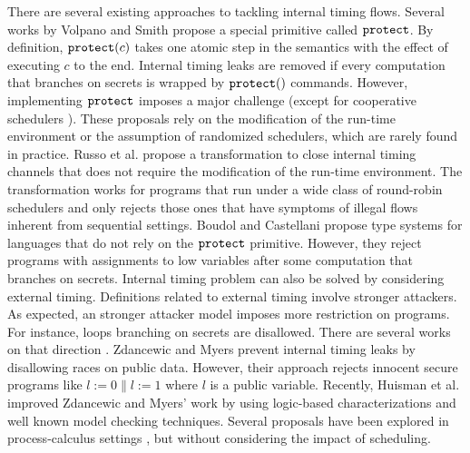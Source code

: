 \documentclass[times, 10pt,twocolumn]{article}
\begin{document}
There are several existing approaches to tackling internal timing
flows. Several works by Volpano and Smith 
\cite{Smith:Volpano:MultiThreaded,Volpano:Smith:Probabilistic,Smith:CSFW01,Smith:CSFW03} 
propose a special primitive called $\mathtt{protect}$. 
By definition, $\mathtt{protect}(c)$ takes 
one atomic step in the semantics with the effect of executing $c$ to
the end. Internal timing leaks are removed 
if every computation that branches on secrets is wrapped by 
$\mathtt{protect}()$ commands. However, implementing $\mathtt{protect}$
imposes a major challenge 
\cite{Sabelfeld:Sands:CSFW00,Sabelfeld:PSI01,Russo:Sabelfeld:CSFW06} 
(except for cooperative schedulers \cite{Russo:Sabelfeld:PSI06}). 
These proposals rely on the modification of the run-time environment
or the assumption of randomized schedulers, which are rarely found in practice.   
Russo et al.  
\cite{Russo:Hughes:Naumann:Sabelfeld:ASIAN06}
propose a transformation to
close internal timing channels that does not require the modification
of the run-time environment. The
transformation works for programs that run under a wide class of
round-robin schedulers and only rejects those ones that have symptoms of illegal
flows inherent from sequential settings.
%
Boudol and Castellani 
\cite{Castellani:Boudol:ICALP01,Castellani:Boudol:TCS02} propose type
systems for languages that do not rely on the $\mathtt{protect}$
primitive. However, they reject programs with assignments to low
variables after some computation that branches on secrets.
%
Internal timing problem can also be solved by considering external
timing. Definitions related to external timing involve stronger
attackers. As expected, an stronger attacker model imposes more
restriction on programs. For instance, loops branching on secrets are 
disallowed. There are several works on that direction 
\cite{Agat:timing, Sabelfeld:Sands:CSFW00, Sabelfeld:PSI01, 
  Sabelfeld:Mantel:SAS02, Kopf:Mantel:FAST05}.
%
Zdancewic and Myers \cite{Zdancewic:Myers:CSFW03} prevent internal timing leaks by
disallowing races on public data. However, their approach
rejects innocent secure programs like $l:=0 \parallel l:=1$ where $l$
is a public variable.
Recently, Huisman et al. \cite{Huisman:Worah:Sunesen:CSFW06} improved
Zdancewic and Myers' work by using logic-based characterizations and
well known model checking techniques.
%
Several proposals have been explored in process-calculus settings 
\cite{Honda+:ESOP00,Focardi:Gorrieri:FOSAD01,Ryan:Bertinoro01,Honda:Yoshida:POPL02,
Pottier:CSFW02}, but without considering the impact of
scheduling. 
\end{document}
